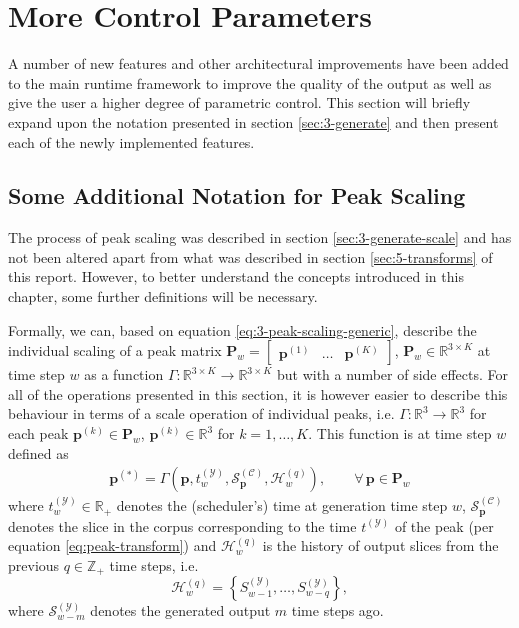 \chapter{More Control Parameters}\label{sec:6-model-improvements}
A number of new features and other architectural improvements have been added to the main runtime framework to improve the quality of the output as well as give the user a higher degree of parametric control. This section will briefly expand upon the notation presented in section \ref{sec:3-generate} and then present each of the newly implemented features.

\section{Some Additional Notation for Peak Scaling}\label{ssec:runtime-recap}

The process of peak scaling was described in section \ref{sec:3-generate-scale} and has not been altered apart from what was described in section \ref{sec:5-transforms} of this report. However, to better understand the concepts introduced in this chapter, some further definitions will be necessary. 

Formally, we can, based on equation \ref{eq:3-peak-scaling-generic}, describe the individual scaling of a peak matrix $\bm P_w = \begin{bmatrix} \bm p^{(1)} & \dots & \bm p^{(K)} \end{bmatrix}$, $\bm P_w \in \mathbb R^{3\times K}$ at time step $w$ as a function $\Gamma \colon \mathbb R^{3\times K} \rightarrow \mathbb R^{3\times K}$ but with a number of side effects. For all of the operations presented in this section, it is however easier to describe this behaviour in terms of a scale operation of individual peaks, i.e. $\Gamma \colon \mathbb R^3 \rightarrow \mathbb R^3$ for each peak $\bm p^{(k)} \in \bm P_w$, $\bm p^{(k)} \in \mathbb R^3$ for $k = 1,\dots,K$. This function is at time step $w$ defined as 
	\begin{align}
		\bm{p^{(\ast)}} =  \Gamma\left(\bm p, t^{(\mathcal Y)}_w, \mathcal S^{(\mathcal C)}_{\bm p}, \mathcal H_w^{(q)}\right), \qquad \forall\, \bm p \in \bm P_w
	\end{align}
	where $t^{(\mathcal Y)}_w \in \mathbb R_+$ denotes the (scheduler's) time at generation time step $w$, $\mathcal S^{(\mathcal C)}_{\bm p}$ denotes the slice in the corpus corresponding to the time $t^{(\mathcal Y)}$ of the peak (per equation \ref{eq:peak-transform}) and $\mathcal H_w^{(q)}$ is the history of output slices from the previous $q \in \mathbb Z_+$ time steps, i.e. 
	\begin{equation}
		\mathcal H_w^{(q)} = \left\lbrace S^{(\mathcal Y)}_{w-1},\dots,S^{(\mathcal Y)}_{w-q}\right\rbrace,
	\end{equation}
	where $\mathcal S^{(\mathcal Y)}_{w-m}$ denotes the generated output $m$ time steps ago.
	
